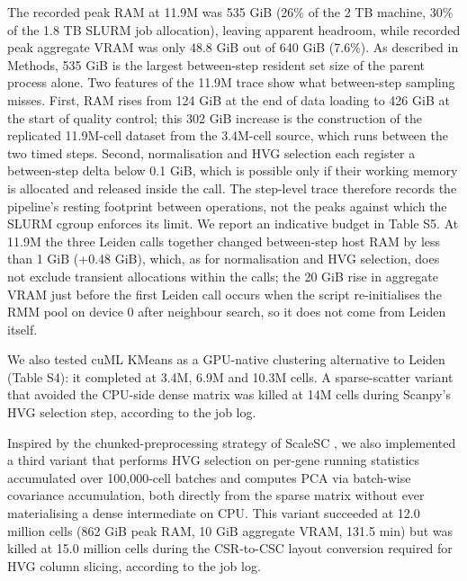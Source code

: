 \documentclass[runningheads]{llncs}
\begin{document}
The recorded peak RAM at 11.9M was 535 GiB (26\% of the 2 TB machine, 30\% of the 1.8 TB SLURM job allocation), leaving apparent headroom, while recorded peak aggregate VRAM was only 48.8 GiB out of 640 GiB (7.6\%). As described in Methods, 535 GiB is the largest between-step resident set size of the parent process alone. Two features of the 11.9M trace show what between-step sampling misses. First, RAM rises from 124 GiB at the end of data loading to 426 GiB at the start of quality control; this 302 GiB increase is the construction of the replicated 11.9M-cell dataset from the 3.4M-cell source, which runs between the two timed steps. Second, normalisation and HVG selection each register a between-step delta below 0.1 GiB, which is possible only if their working memory is allocated and released inside the call. The step-level trace therefore records the pipeline's resting footprint between operations, not the peaks against which the SLURM cgroup enforces its limit. We report an indicative budget in Table S5. At 11.9M the three Leiden calls together changed between-step host RAM by less than 1 GiB (+0.48 GiB), which, as for normalisation and HVG selection, does not exclude transient allocations within the calls; the 20 GiB rise in aggregate VRAM just before the first Leiden call occurs when the script re-initialises the RMM pool on device 0 after neighbour search, so it does not come from Leiden itself.

We also tested cuML KMeans as a GPU-native clustering alternative to Leiden (Table S4): it completed at 3.4M, 6.9M and 10.3M cells.
A sparse-scatter variant that avoided the CPU-side dense matrix was killed at 14M cells during Scanpy's HVG selection step, according to the job log.

Inspired by the chunked-preprocessing strategy of ScaleSC \cite{Hu2025}, we also implemented a third variant that performs HVG selection on per-gene running statistics accumulated over 100,000-cell batches and computes PCA via batch-wise covariance accumulation, both directly from the sparse matrix without ever materialising a dense intermediate on CPU. This variant succeeded at 12.0 million cells (862 GiB peak RAM, 10 GiB aggregate VRAM, 131.5 min) but was killed at 15.0 million cells during the CSR-to-CSC layout conversion required for HVG column slicing, according to the job log.
\end{document}
